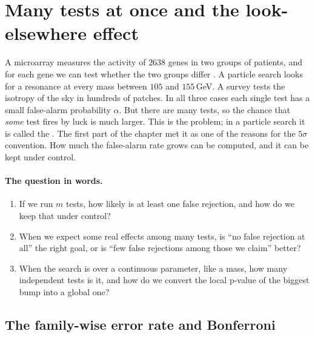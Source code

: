 \section{Many tests at once and the look-elsewhere effect}
\label{4b:sec:lee}

A microarray measures the activity of $2638$ genes in two groups of patients,
and for each gene we can test whether the two groups differ
. A particle search looks for a resonance at every mass between
$105$ and $155\,$GeV. A survey tests the isotropy of the sky in hundreds of
patches. In all three cases each single test has a small false-alarm
probability $\alpha$. But there are many tests, so the chance that \emph{some}
test fires by luck is much larger. This is the 
problem; in a particle search it is called the . The first part of the chapter met it as one of the reasons for the
$5\sigma$ convention. How much the false-alarm rate grows can be computed, and
it can be kept under control.

\paragraph{The question in words.}
\begin{enumerate}[label=\arabic*.]
  \item If we run $m$ tests, how likely is at least one false rejection, and
        how do we keep that under control?
  \item When we expect some real effects among many tests, is ``no false
        rejection at all'' the right goal, or is ``few false rejections among
        those we claim'' better?
  \item When the search is over a continuous parameter, like a mass, how many
        independent tests is it, and how do we convert the local p-value of the
        biggest bump into a global one?
\end{enumerate}

\subsection{The family-wise error rate and Bonferroni}
\label{4b:sec:bonferroni}

